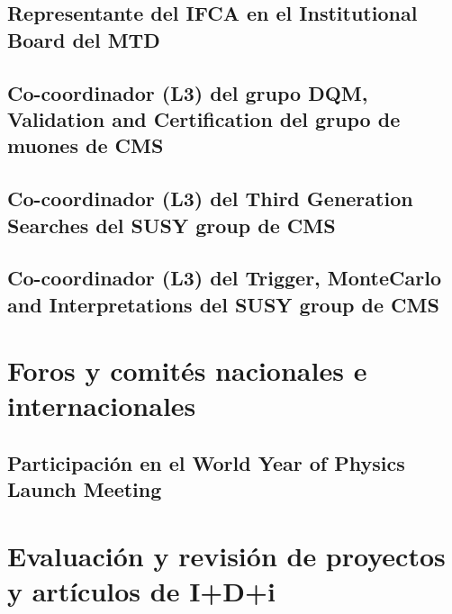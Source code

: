 \documentclass[a4paper, 11pt, twoside, openright]{report}
\begin{document}
\subsection{Representante del IFCA en el Institutional Board del MTD}


\subsection{Co-coordinador (L3) del grupo DQM, Validation and Certification del grupo de muones de CMS}


\subsection{Co-coordinador (L3) del Third Generation Searches del SUSY group de CMS}


\subsection{Co-coordinador (L3) del Trigger, MonteCarlo and Interpretations del SUSY group de CMS}



\section{Foros y comités nacionales e internacionales}

\subsection{Participación en el World Year of Physics Launch Meeting}




\section{Evaluación y revisión de proyectos y artículos de I+D+i}
\end{document}
